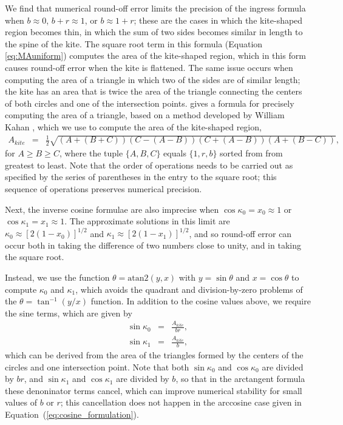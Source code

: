 \documentclass[modern]{aastex61}
\begin{document}
We find that numerical round-off error limits the precision of the ingress formula when
$b \approx 0$, $b+r \approx 1$, or $b \approx 1+r$;  these are the cases in which
the kite-shaped region becomes thin, in which the sum of two sides becomes similar
in length to the spine of the kite.  The square root term in this formula (Equation
\ref{eq:MAuniform}) computes the area of the kite-shaped region, which in this
form causes round-off error when the kite is flattened.  The same issue occurs when
computing the area of a triangle in which two of the sides are of similar length;
the kite has an area that is twice the area of the triangle connecting the centers
of both circles and one of the intersection points.  \cite{Goldberg1991} gives a
formula for precisely computing the area of a triangle, based on a method developed
by William Kahan \citep[later described in][]{Kahan2000}, which we use to compute
the area of the kite-shaped region,
\begin{eqnarray}\label{eq:Kite_area}
A_{kite} &=& \frac{1}{2}\sqrt{(A+(B+C))(C-(A-B))(C+(A-B))(A+(B-C))},
\end{eqnarray}
for $A \ge B \ge C$, where the tuple $\{A,B,C\}$ equals $\{1,r,b\}$
sorted from from greatest to least.  Note that the order of operations
needs to be carried out as specified by the series of parentheses in
the entry to the square root;  this sequence of operations preserves
numerical precision.

Next, the inverse cosine formulae are also imprecise when $\cos{\kappa_0} = x_0 \approx
1$ or $\cos{\kappa_1} = x_1 \approx 1$.  The approximate solutions in this limit
are $\kappa_0 \approx [2(1-x_0)]^{1/2}$ and $\kappa_1 \approx [2(1-x_1)]^{1/2}$, and so round-off
error can occur both in taking the difference of two numbers close to unity,
and in taking the square root.

Instead, we use the function $\theta = \mathrm{atan2}(y,x)$ with $y=\sin{\theta}$ and
$x=\cos{\theta}$ to compute $\kappa_0$ and $\kappa_1$, which avoids the quadrant and
division-by-zero problems of the $\theta = \tan^{-1}(y/x)$ function.  In addition
to the cosine values above, we require the sine terms, which are given by
\begin{eqnarray}
\sin{\kappa_0} &=& \frac{A_{kite}}{br},\nonumber\\
\sin{\kappa_1} &=& \frac{A_{kite}}{b},
\end{eqnarray}
which can be derived from the area of the triangles formed by the centers of
the circles and one intersection point.
Note that both $\sin{\kappa_0}$ and $\cos{\kappa_0}$ are divided by $br$, and
$\sin{\kappa_1}$ and $\cos{\kappa_1}$ are divided by $b$, so that
in the arctangent formula these denoninator terms cancel, which can improve
numerical stability for small values of $b$ or $r$; this cancellation does not happen
in the arccosine case given in Equation~(\ref{eq:cosine_formulation}).
\end{document}

